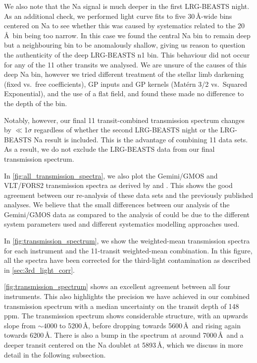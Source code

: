 \documentclass[twocolumn]{aastex63}
\begin{document}
We also note that the Na signal is much deeper in the first LRG-BEASTS night. As an additional check, we performed light curve fits to five 30\,\AA-wide bins centered on Na to see whether this was caused by systematics related to the 20\,\AA\ bin being too narrow. In this case we found the central Na bin to remain deep but a neighbouring bin to be anomalously shallow, giving us reason to question the authenticity of the deep LRG-BEASTS n1 bin. This behaviour did not occur for any of the 11 other transits we analysed. We are unsure of the causes of this deep Na bin, however we tried different treatment of the stellar limb darkening (fixed vs.\ free coefficients), GP inputs and GP kernels (Mat\'{e}rn 3/2 vs.\ Squared Exponential), and the use of a flat field, and found these made no difference to the depth of the bin. 

Notably, however, our final 11 transit-combined transmission spectrum changes by $\ll$1$\sigma$ regardless of whether the second LRG-BEASTS night or the LRG-BEASTS Na result is included. This is the advantage of combining 11 data sets. As a result, we do not exclude the LRG-BEASTS data from our final transmission spectrum. 

In \autoref{fig:all_transmission_spectra}, we also plot the Gemini/GMOS and VLT/FORS2 transmission spectra as derived by \cite{Lendl2017} and \cite{Wilson2020}. This shows the good agreement between our re-analysis of these data sets and the previously published analyses. We believe that the small differences between our analysis of the Gemini/GMOS data as compared to the analysis of \cite{Lendl2017} could be due to the different system parameters used and different systematics modelling approaches used. 


In \autoref{fig:transmission_spectrum}, we show the weighted-mean transmission spectra for each instrument and the 11-transit weighted-mean combination. In this figure, all the spectra have been corrected for the third-light contamination as described in \autoref{sec:3rd_light_corr}. 

\autoref{fig:transmission_spectrum} shows an excellent agreement between all four instruments. This also highlights the precision we have achieved in our combined transmission spectrum with a median uncertainty on the transit depth of 148\,ppm. The transmission spectrum shows considerable structure, with an upwards slope from $\sim 4000$ to 5200\,\AA, before dropping towards 5600\,\AA\ and rising again towards 6200\,\AA. There is also a bump in the spectrum at around 7000\,\AA\ and a deeper transit centered on the Na doublet at 5893\,\AA, which we discuss in more detail in the following subsection. 
\end{document}
